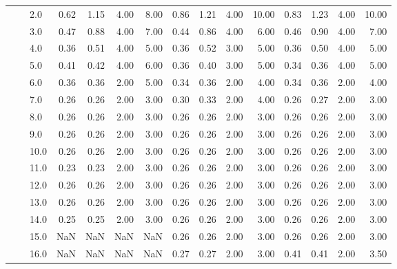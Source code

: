 \begin{tabular}{lllrrrrrrrrrrrr}
      &     & 2.0  &       0.62 &      1.15 & 4.00 &   8.00 &       0.86 &      1.21 & 4.00 &  10.00 &       0.83 &      1.23 & 4.00 &  10.00 \\
      &     & 3.0  &       0.47 &      0.88 & 4.00 &   7.00 &       0.44 &      0.86 & 4.00 &   6.00 &       0.46 &      0.90 & 4.00 &   7.00 \\
      &     & 4.0  &       0.36 &      0.51 & 4.00 &   5.00 &       0.36 &      0.52 & 3.00 &   5.00 &       0.36 &      0.50 & 4.00 &   5.00 \\
      &     & 5.0  &       0.41 &      0.42 & 4.00 &   6.00 &       0.36 &      0.40 & 3.00 &   5.00 &       0.34 &      0.36 & 4.00 &   5.00 \\
      &     & 6.0  &       0.36 &      0.36 & 2.00 &   5.00 &       0.34 &      0.36 & 2.00 &   4.00 &       0.34 &      0.36 & 2.00 &   4.00 \\
      &     & 7.0  &       0.26 &      0.26 & 2.00 &   3.00 &       0.30 &      0.33 & 2.00 &   4.00 &       0.26 &      0.27 & 2.00 &   3.00 \\
      &     & 8.0  &       0.26 &      0.26 & 2.00 &   3.00 &       0.26 &      0.26 & 2.00 &   3.00 &       0.26 &      0.26 & 2.00 &   3.00 \\
      &     & 9.0  &       0.26 &      0.26 & 2.00 &   3.00 &       0.26 &      0.26 & 2.00 &   3.00 &       0.26 &      0.26 & 2.00 &   3.00 \\
      &     & 10.0 &       0.26 &      0.26 & 2.00 &   3.00 &       0.26 &      0.26 & 2.00 &   3.00 &       0.26 &      0.26 & 2.00 &   3.00 \\
      &     & 11.0 &       0.23 &      0.23 & 2.00 &   3.00 &       0.26 &      0.26 & 2.00 &   3.00 &       0.26 &      0.26 & 2.00 &   3.00 \\
      &     & 12.0 &       0.26 &      0.26 & 2.00 &   3.00 &       0.26 &      0.26 & 2.00 &   3.00 &       0.26 &      0.26 & 2.00 &   3.00 \\
      &     & 13.0 &       0.26 &      0.26 & 2.00 &   3.00 &       0.26 &      0.26 & 2.00 &   3.00 &       0.26 &      0.26 & 2.00 &   3.00 \\
      &     & 14.0 &       0.25 &      0.25 & 2.00 &   3.00 &       0.26 &      0.26 & 2.00 &   3.00 &       0.26 &      0.26 & 2.00 &   3.00 \\
      &     & 15.0 &        NaN &       NaN &  NaN &    NaN &       0.26 &      0.26 & 2.00 &   3.00 &       0.26 &      0.26 & 2.00 &   3.00 \\
      &     & 16.0 &        NaN &       NaN &  NaN &    NaN &       0.27 &      0.27 & 2.00 &   3.00 &       0.41 &      0.41 & 2.00 &   3.50 \\

\end{tabular}
